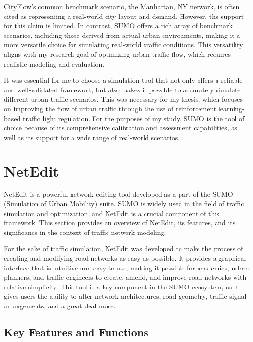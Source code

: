 CityFlow's common benchmark scenario, the Manhattan, NY network, is often cited as representing a real-world city layout and demand. However, the support for this claim is limited. In contrast, SUMO offers a rich array of benchmark scenarios, including those derived from actual urban environments, making it a more versatile choice for simulating real-world traffic conditions. This versatility aligns with my research goal of optimizing urban traffic flow, which requires realistic modeling and evaluation.

It was essential for me to choose a simulation tool that not only offers a reliable and well-validated framework, but also makes it possible to accurately simulate different urban traffic scenarios. This was necessary for my thesis, which focuses on improving the flow of urban traffic through the use of reinforcement learning-based traffic light regulation. For the purposes of my study, SUMO is the tool of choice because of its comprehensive calibration and assessment capabilities, as well as its support for a wide range of real-world scenarios.

\section{NetEdit} \label{sec:netedit}
NetEdit is a powerful network editing tool developed as a part of the SUMO (Simulation of Urban Mobility)\cite{SUMO2018} suite. SUMO is widely used in the field of traffic simulation and optimization, and NetEdit is a crucial component of this framework. This section provides an overview of NetEdit, its features, and its significance in the context of traffic network modeling.

For the sake of traffic simulation, NetEdit was developed to make the process of creating and modifying road networks as easy as possible. It provides a graphical interface that is intuitive and easy to use, making it possible for academics, urban planners, and traffic engineers to create, amend, and improve road networks with relative simplicity. This tool is a key component in the SUMO ecosystem, as it gives users the ability to alter network architectures, road geometry, traffic signal arrangements, and a great deal more.

\subsection{Key Features and Functions}

